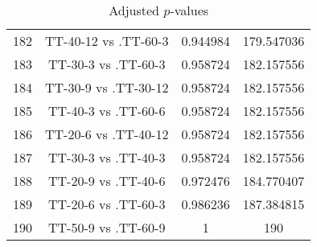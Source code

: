 \documentclass[a4paper,10pt]{article}
\begin{document}
\begin{landscape}
\begin{table}[!htp]
\begin{tabular}{cccc}
182&TT-40-12 vs .TT-60-3&0.944984&179.547036\\
183&TT-30-3 vs .TT-60-3&0.958724&182.157556\\
184&TT-30-9 vs .TT-30-12&0.958724&182.157556\\
185&TT-40-3 vs .TT-60-6&0.958724&182.157556\\
186&TT-20-6 vs .TT-40-12&0.958724&182.157556\\
187&TT-30-3 vs .TT-40-3&0.958724&182.157556\\
188&TT-20-9 vs .TT-40-6&0.972476&184.770407\\
189&TT-20-6 vs .TT-60-3&0.986236&187.384815\\
190&TT-50-9 vs .TT-60-9&1&190\\
\hline
\end{tabular}
\caption{Adjusted $p$-values}
\end{table}

\end{landscape}
\end{document}
